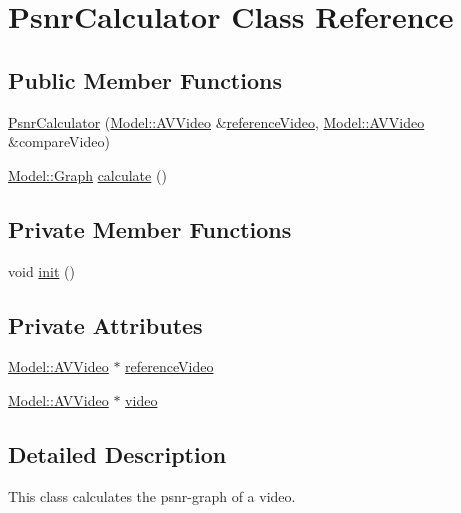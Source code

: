\hypertarget{classUtility_1_1PsnrCalculator}{}\section{Psnr\+Calculator Class Reference}
\label{classUtility_1_1PsnrCalculator}
\subsection*{Public Member Functions}
\begin{DoxyCompactItemize}
\item 
\hyperlink{classUtility_1_1PsnrCalculator_af9b7f590502107d7fa40cfb6288287f5}{Psnr\+Calculator} (\hyperlink{classModel_1_1AVVideo}{Model\+::\+A\+V\+Video} \&\hyperlink{classUtility_1_1PsnrCalculator_ac18ce56ef484f4499434c4b5c5fafc8a}{reference\+Video}, \hyperlink{classModel_1_1AVVideo}{Model\+::\+A\+V\+Video} \&compare\+Video)
\item 
\hyperlink{classModel_1_1Graph}{Model\+::\+Graph} \hyperlink{classUtility_1_1PsnrCalculator_add29b5117d03aca3e7bb3199edc95cd5}{calculate} ()
\end{DoxyCompactItemize}
\subsection*{Private Member Functions}
\begin{DoxyCompactItemize}
\item 
void \hyperlink{classUtility_1_1PsnrCalculator_a02fd73d861ef2e4aabb38c0c9ff82947}{init} ()
\end{DoxyCompactItemize}
\subsection*{Private Attributes}
\begin{DoxyCompactItemize}
\item 
\hyperlink{classModel_1_1AVVideo}{Model\+::\+A\+V\+Video} $\ast$ \hyperlink{classUtility_1_1PsnrCalculator_ac18ce56ef484f4499434c4b5c5fafc8a}{reference\+Video}
\item 
\hyperlink{classModel_1_1AVVideo}{Model\+::\+A\+V\+Video} $\ast$ \hyperlink{classUtility_1_1PsnrCalculator_a9d9339a030e5aa3b959eecf241b6ffac}{video}
\end{DoxyCompactItemize}


\subsection{Detailed Description}
This class calculates the psnr-\/graph of a video. 

